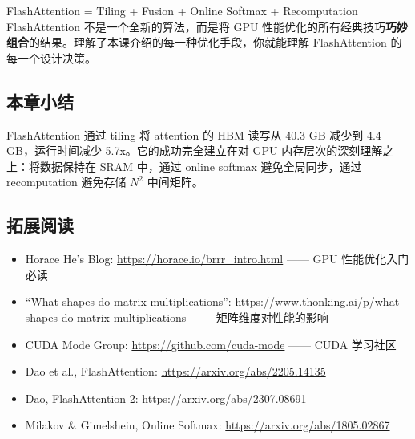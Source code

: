 \begin{importantbox}{FlashAttention = Tiling + Fusion + Online Softmax + Recomputation}
FlashAttention 不是一个全新的算法，而是将 GPU 性能优化的所有经典技巧\textbf{巧妙组合}的结果。理解了本课介绍的每一种优化手段，你就能理解 FlashAttention 的每一个设计决策。
\end{importantbox}

\subsection{本章小结}

FlashAttention 通过 tiling 将 attention 的 HBM 读写从 40.3 GB 减少到 4.4 GB，运行时间减少 5.7x。它的成功完全建立在对 GPU 内存层次的深刻理解之上：将数据保持在 SRAM 中，通过 online softmax 避免全局同步，通过 recomputation 避免存储 $N^2$ 中间矩阵。

\subsection{拓展阅读}

\begin{itemize}
    \item Horace He's Blog: \url{https://horace.io/brrr_intro.html} —— GPU 性能优化入门必读
    \item ``What shapes do matrix multiplications'': \url{https://www.thonking.ai/p/what-shapes-do-matrix-multiplications} —— 矩阵维度对性能的影响
    \item CUDA Mode Group: \url{https://github.com/cuda-mode} —— CUDA 学习社区
    \item Dao et al., FlashAttention: \url{https://arxiv.org/abs/2205.14135}
    \item Dao, FlashAttention-2: \url{https://arxiv.org/abs/2307.08691}
    \item Milakov \& Gimelshein, Online Softmax: \url{https://arxiv.org/abs/1805.02867}
\end{itemize}


